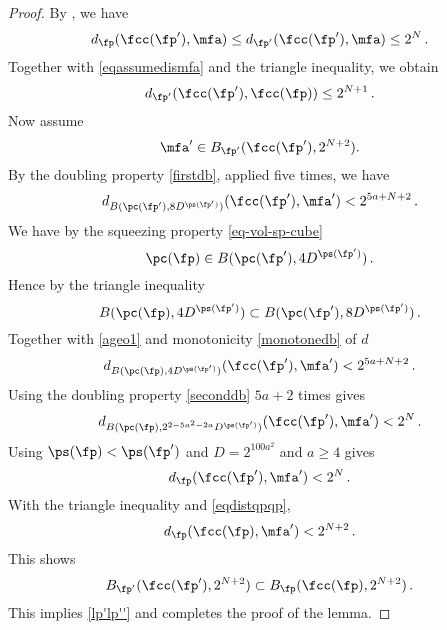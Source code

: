 \begin{proof}
By , we have
\begin{equation}
     d_{\fp}(\fcc(\fp'),\mfa)
     \le d_{\fp'}(\fcc(\fp'),\mfa)
     \le 2^{N} \, .
\end{equation}
Together with \eqref{eqassumedismfa} and the triangle inequality, we obtain
\begin{equation}\label{eqdistqpqp}
    d_{\fp'}(\fcc(\fp'),\fcc(\fp))\le 2^{N+1} \, .
\end{equation}
Now assume
\begin{equation}
    \mfa'\in B_{\fp'}(\fcc(\fp'),2^{N+2}).
\end{equation}
By the doubling property \eqref{firstdb}, applied five times, we have
\begin{equation}\label{ageo1} d_{B(\pc(\fp'),8D^{\ps(\fp')})}(\fcc(\fp'),\mfa') < 2^{5a+N+2}\, .
\end{equation}
We have by the squeezing property \eqref{eq-vol-sp-cube}
\begin{equation}
 \pc(\fp)\in
B(\pc(\fp'),4D^{\ps(\fp')})\, .
\end{equation}
Hence by the triangle inequality
\begin{equation}
 B(\pc(\fp), 4D^{\ps(\fp')})
 \subset
B(\pc(\fp'),8D^{\ps(\fp')})\, .
\end{equation}
Together with \eqref{ageo1} and monotonicity \eqref{monotonedb} of $d$
\begin{equation}
    d_{B(\pc(\fp),4D^{\ps(\fp')})}(\fcc(\fp'),\mfa') < 2^{5a+N+2}\, .
\end{equation}
Using the doubling property \eqref{seconddb} $5a+2$ times gives
\begin{equation}
    d_{B(\pc(\fp),2^{2-5a^2-2a}D^{\ps(\fp')})}(\fcc(\fp'),\mfa') < 2^{N}\, .
\end{equation}
Using $\ps(\fp)<\ps(\fp')$ and $D=2^{100a^2}$ and $a\ge 4$ gives
\begin{equation}
    d_{\fp}(\fcc(\fp'),\mfa') < 2^{N}\, .
\end{equation}
With the triangle inequality and \eqref{eqdistqpqp},
\begin{equation}
    d_{\fp}(\fcc(\fp),\mfa') < 2^{N+2}\, .
\end{equation}
This shows
\begin{equation}
B_{\fp'}(\fcc(\fp'),2^{N+2})\subset B_{\fp}(\fcc(\fp),2^{N+2})\, .
\end{equation}
This implies \eqref{lp'lp''} and completes the proof of the lemma.
\end{proof}

